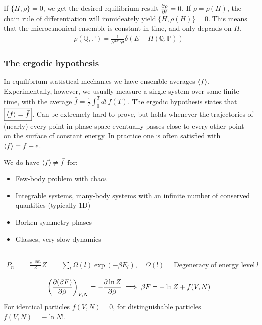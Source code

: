 \documentclass[a4paper, english, 12pt]{article}
\newcommand{\eps}{\epsilon}
\newcommand{\closed}[1]{\left( #1 \right)}
\newcommand{\curly}[1]{\{ #1 \} }
\newcommand{\Q}{\mathbb{Q}}
\renewcommand{\P}{\mathbb{P}}
\begin{document}
\begin{multicols*}{2}
If $\curly{H,\rho}=0$, we get the desired equilibrium result $\pdv{\rho}{t}=0$. If $\rho=\rho(H)$, the chain rule of differentiation will immideately yield $\curly{H,\rho(H)}=0$. This means that the microcanonical ensemble is constant in time, and only depends on $H$. 
\begin{align*}
    \rho(\Q,\P) = \frac{1}{h^{3N} N!} \delta\closed{E-H(\Q,\P)}
\end{align*}


\subsubsection*{\scriptsize The ergodic hypothesis}
In equilibrium statistical mechanics we have ensemble averages $\expval{f}$. Experimentally, however, we usually measure a single system over some finite time, with the average $\bar{f}=\frac{1}{T} \int_0^T dt\,f(T)$. The ergodic hypothesis states that $\boxed{\expval{f}=\bar{f}}$. Can be extremely hard to prove, but holds whenever the trajectories of (nearly) every point in phase-space eventually passes close to every other point on the surface of constant energy. In practice one is often satisfied with $\expval{f}=\bar{f}+\eps$. 

We do have $\expval{f}\neq\bar{f}$ for:
\begin{itemize}
    \item Few-body problem with chaos 
    \item Integrable systems, many-body systems with an infinite number of conserved quantities (typically 1D)
    \item Borken symmetry phases
    \item Glasses, very slow dynamics
\end{itemize} 


\subsection*{}

\begin{align*}
    P_n &= \frac{e^{-\beta E_n}}{Z}
    Z &= \sum_l \Omega(l)\exp(-\beta E_l),\quad \Omega(l)=\text{Degeneracy of energy level}\: l
\end{align*}


\begin{align*}
    \closed{\pdv{(\beta F)}{\beta}}_{V,N} = -\pdv{\ln Z}{\beta} \implies \beta F = -\ln Z + f(V,N)
\end{align*}
For identical particles $f(V,N)=0$, for distinguishable particles $f(V,N)=-\ln N!$. 


\end{multicols*}
\end{document}
